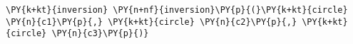 \begin{Verbatim}[commandchars=\\\{\}]
    \PY{k+kt}{inversion} \PY{n+nf}{inversion}\PY{p}{(}\PY{k+kt}{circle} \PY{n}{c1}\PY{p}{,} \PY{k+kt}{circle} \PY{n}{c2}\PY{p}{,} \PY{k+kt}{circle} \PY{n}{c3}\PY{p}{)}
\end{Verbatim}
